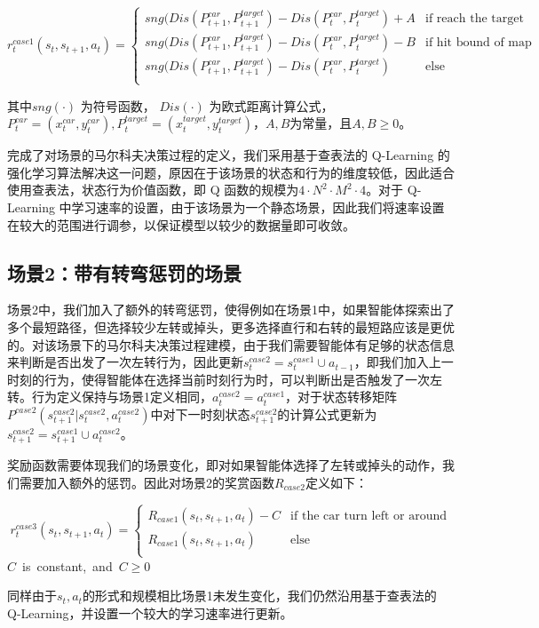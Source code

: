 \documentclass{standalone}
\begin{document}
\begin{center}
    \begin{equation}
    \label{rewardcase1}
    r_t^{case1}(s_t, s_{t+1}, a_t) = \begin{cases}
     sng(Dis(P_{t+1}^{car}, P_{t+1}^{target}) - Dis(P_{t}^{car}, P_{t}^{target}) + A &\mbox{if reach the target}\\
     sng(Dis(P_{t+1}^{car}, P_{t+1}^{target}) - Dis(P_{t}^{car}, P_{t}^{target}) - B &\mbox{if hit bound of map}\\
     sng(Dis(P_{t+1}^{car}, P_{t+1}^{target}) - Dis(P_{t}^{car}, P_{t}^{target}) &\mbox{else}\\
     \end{cases}
    \end{equation}
\end{center}
其中$sng(\cdot)$ 为符号函数， $Dis(\cdot)$ 为欧式距离计算公式，$P_{t}^{car} = (x_t^{car}, y_t^{car}), P_{t}^{target} = (x^{target}_t, y^{target}_t)$，$A,B$为常量，且$A, B \geq 0$。\par

完成了对场景的马尔科夫决策过程的定义，我们采用基于查表法的 Q-Learning 的强化学习算法解决这一问题，原因在于该场景的状态和行为的维度较低，因此适合使用查表法，状态行为价值函数，即 Q 函数的规模为$4\cdot N^2\cdot M^2 \cdot 4$。对于 Q-Learning 中学习速率的设置，由于该场景为一个静态场景，因此我们将速率设置在较大的范围进行调参，以保证模型以较少的数据量即可收敛。
\subsection{场景2：带有转弯惩罚的场景}
场景2中，我们加入了额外的转弯惩罚，使得例如在场景1中，如果智能体探索出了多个最短路径，但选择较少左转或掉头，更多选择直行和右转的最短路应该是更优的。对该场景下的马尔科夫决策过程建模，由于我们需要智能体有足够的状态信息来判断是否出发了一次左转行为，因此更新$s_t^{case2}=s_t^{case1}\cup a_{t-1}$，即我们加入上一时刻的行为，使得智能体在选择当前时刻行为时，可以判断出是否触发了一次左转。行为定义保持与场景1定义相同，$a_t^{case2} = a_t^{case1}$，对于状态转移矩阵$P^{case2}(s_{t+1}^{case2}|s_t^{case2}, a_t^{case2})$中对下一时刻状态$s_{t+1}^{case2}$的计算公式更新为$s_{t+1}^{case2} = s_{t+1}^{case1} \cup a_t^{case2}$。\par
奖励函数需要体现我们的场景变化，即对如果智能体选择了左转或掉头的动作，我们需要加入额外的惩罚。因此对场景2的奖赏函数$R_{case2}$定义如下：
\begin{center}
    \begin{equation}
    \label{eq2reward}
    r_t^{case3}(s_t, s_{t+1}, a_t) = \begin{cases}
     R_{case1}(s_t, s_{t+1}, a_t) - C &\mbox{if the car turn left or around}\\
     R_{case1}(s_t, s_{t+1}, a_t) &\mbox{else}\\
     \end{cases}
    \end{equation}
   \mbox{$C$ is constant, and $C \geq 0$}

\end{center}
同样由于$s_t, a_t$的形式和规模相比场景1未发生变化，我们仍然沿用基于查表法的 Q-Learning，并设置一个较大的学习速率进行更新。
\end{document}

